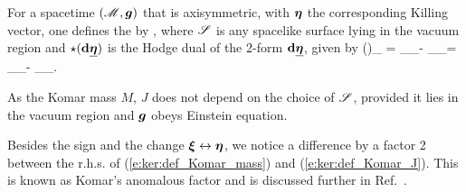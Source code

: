 For a spacetime $(\mathscr{M},\bm{g})$ that is axisymmetric, with $\bm{\eta}$
the corresponding Killing vector, one defines the 
by
\be \label{e:ker:def_Komar_J}
     ,
\ee
where $\mathscr{S}$ is any spacelike surface lying in the vacuum region and $\star(\mathbf{d} \underline{\bm{\eta}})$
is the Hodge dual of the 2-form $\mathbf{d} \underline{\bm{\eta}}$, given by
\be \label{e:ker:dueta_nab}
    (\dd \uu{\eta})_{\alpha\beta} =
        \partial_\alpha \eta_\beta - \partial_\beta \eta_\alpha =
        \nabla_\alpha \eta_\beta - \nabla_\beta \eta_\alpha .
\ee

As the Komar mass $M$, $J$ does not depend on the choice of $\mathscr{S}$,
provided it lies in the vacuum region and $\bm{g}$ obeys Einstein equation.

\begin{remark}
Besides the sign and the change $\bm{\xi}\leftrightarrow\bm{\eta}$, we notice a difference by a factor 2 between the r.h.s. of (\ref{e:ker:def_Komar_mass}) and (\ref{e:ker:def_Komar_J}).
This is known as Komar's anomalous factor and is discussed further in
Ref.~\cite{Katz85}.
\end{remark}

